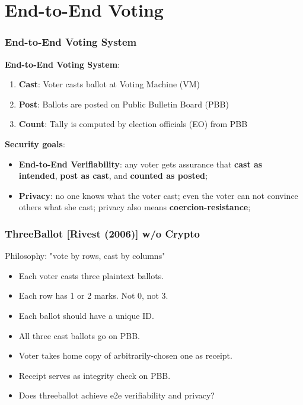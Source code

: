 \section{End-to-End Voting}
\begin{frame}\frametitle{End-to-End Voting System}
\textbf{End-to-End Voting System}:
\begin{enumerate}
\item \textbf{Cast}: Voter casts ballot at Voting Machine (VM) %
\item \textbf{Post}: Ballots are posted on Public Bulletin Board (PBB)
\item \textbf{Count}: Tally is computed by election officials (EO) from PBB
\end{enumerate}
\textbf{Security goals}:
\begin{itemize}
\item \textbf{End-to-End Verifiability}: any voter gets assurance that \textbf{cast as intended}, \textbf{post as cast}, and \textbf{counted as posted};
\item \textbf{Privacy}: no one knows what the voter cast; even the voter can not convince others what she cast; privacy also means \textbf{coercion-resistance};
\end{itemize}
\end{frame}
\begin{frame}\frametitle{ThreeBallot [Rivest (2006)] w/o Crypto}
Philosophy: "vote by rows, cast by columns"
\begin{figure}
\begin{center}

\end{center}
\end{figure}
\begin{itemize}
\item Each voter casts three plaintext ballots.
\item Each row has 1 or 2 marks. Not 0, not 3.
\item Each ballot should have a unique ID.
\item All three cast ballots go on PBB.
\item Voter takes home copy of arbitrarily-chosen one as receipt.
\item Receipt serves as integrity check on PBB.
\item \alert{Does threeballot achieve e2e verifiability and privacy?}
\end{itemize}
\end{frame}
